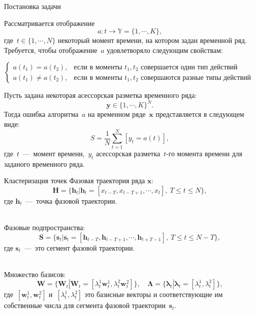 \documentclass[10pt,pdf,hyperref={unicode}]{beamer}
\begin{document}
\begin{frame}[shrink=5]{Постановка задачи}

Рассматривается отображение
$$
a : t \to \mathbb{Y} = \{1,\cdots, K\}, 
$$
где~$t \in \{1,\cdots, N\}$ некоторый момент времени, на котором задан временной ряд.
Требуется, чтобы отображение~$a$ удовлетворяло следующим свойствам:

$$
\begin{cases}
    a\left(t_1\right) = a\left(t_2\right), &  \text{если в моменты } t_1, t_2 \text{ совершается один тип действий}\\
    a\left(t_1\right) \not= a\left(t_2\right), &  \text{если в моменты } t_1, t_2 \text{ совершаются разные типы действий }
\end{cases}
$$

Пусть задана некоторая асессорская разметка временного ряда:
$$
\textbf{y} \in \{1,\cdots,K\}^{N}.
$$
Тогда ошибка алгоритма~$a$ на временном ряде~$\textbf{x}$ представляется в следующем виде:
$$
S = \frac{1}{N}\sum_{t=1}^{N}[y_t = a\left(t\right)],
$$
где~$t$~---~момент времени,~$y_t$ асессорская разметка~$t$-го момента времени для заданого временного ряда.

\end{frame}
\begin{frame}{Кластеризация точек}
Фазовая траектория ряда $\textbf{x}$:
$$\mathbf{H} = \{\textbf{h}_t| \textbf{h}_t = [x_{t-T}, x_{t-T+1}, \cdots, x_{t}],~T\leq t\leq N\},$$
где $\textbf{h}_t$~---~точка фазовой траектории.

~\\
Фазовые подпространства:
$$\mathbf{S} = \{\textbf{s}_t| \textbf{s}_t = [\textbf{h}_{t-T}, \textbf{h}_{t-T+1}, \cdots, \textbf{h}_{t+T-1}],~T\leq t\leq N-T\},$$
где $\textbf{s}_t$~---~это сегмент фазовой траектории.

~\\
Множество базисов:
$$\mathbf{W} = \{\textbf{W}_t| \textbf{W}_t = [\lambda^1_t\textbf{w}^1_t, \lambda^2_t\textbf{w}^2_t]\}, \quad \bm{\Lambda} = \{\bm{\lambda}_t| \bm{\lambda}_t=[\lambda^1_t, \lambda^2_t]\},$$
где~$[\textbf{w}^1_t, \textbf{w}^2_t]$ и~$[\lambda^1_t, \lambda^2_t]$ это базисные векторы и соответствующие им собственные числа для сегмента фазовой траектории~$\textbf{s}_t$.
\end{frame}
\end{document}
